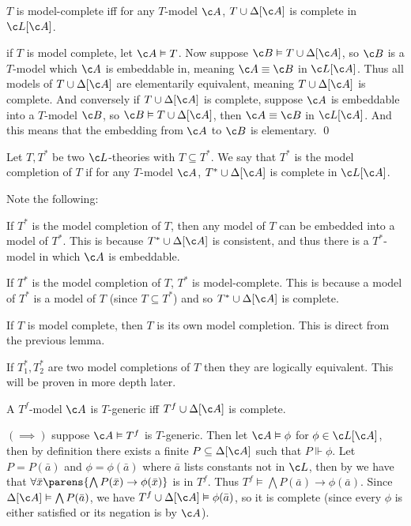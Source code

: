 \ethrm

\blemm

    $T$ is model-complete iff for any $T$-model $\c A$, $T\cup\Delta[\c A]$ is complete in $\c L[\c A]$.

\elemm

\Proof if $T$ is model complete, let $\c A\vDash T$.
Now suppose $\c B\vDash T\cup\Delta[\c A]$, so $\c B$ is a $T$-model which $\c A$ is embeddable in, meaning $\c A\equiv\c B$ in $\c L[\c A]$.
Thus all models of $T\cup\Delta[\c A]$ are elementarily equivalent, meaning $T\cup\Delta[\c A]$ is complete.
And conversely if $T\cup\Delta[\c A]$ is complete, suppose $\c A$ is embeddable into a $T$-model $\c B$, so $\c B\vDash T\cup\Delta[\c A]$, then $\c A\equiv\c B$ in $\c L[\c A]$.
And this means that the embedding from $\c A$ to $\c B$ is elementary.
\qed

\bdefn

    Let $T,T^*$ be two $\c L$-theories with $T\subseteq T^*$.
    We say that $T^*$ is the {\emphcolor model completion} of $T$ if for any $T$-model $\c A$, $T^*\cup\Delta[\c A]$ is complete in $\c L[\c A]$.

\edefn

Note the following:
\benum
    \item If $T^*$ is the model completion of $T$, then any model of $T$ can be embedded into a model of $T^*$.
    This is because $T^*\cup\Delta[\c A]$ is consistent, and thus there is a $T^*$-model in which $\c A$ is embeddable.
    \item If $T^*$ is the model completion of $T$, $T^*$ is model-complete.
    This is because a model of $T^*$ is a model of $T$ (since $T\subseteq T^*$) and so $T^*\cup\Delta[\c A]$ is complete.
    \item If $T$ is model complete, then $T$ is its own model completion.
    This is direct from the previous lemma.
    \item If $T_1^*,T_2^*$ are two model completions of $T$ then they are logically equivalent.
    This will be proven in more depth later.
\eenum

\bthrm[name=thrm5.2]

    A $T^f$-model $\c A$ is $T$-generic iff $T^f\cup\Delta[\c A]$ is complete.

\ethrm

\Proof $(\implies)$ suppose $\c A\vDash T^f$ is $T$-generic.
Then let $\c A\vDash\phi$ for $\phi\in\c L[\c A]$, then by definition there exists a finite $P\subseteq\Delta[\c A]$ such that $P\Vdash\phi$.
Let $P=P(\bar a)$ and $\phi=\phi(\bar a)$ where $\bar a$ lists constants not in $\c L$, then by  we have that $\forall\bar x\parens{\bigwedge P(\bar x)\to\phi(\bar x)}$ is
in $T^f$.
Thus $T^f\vDash\bigwedge P(\bar a)\to\phi(\bar a)$.
Since $\Delta[\c A]\vDash\bigwedge P(\bar a)$, we have $T^f\cup\Delta[\c A]\vDash\phi(\bar a)$, so it is complete (since every $\phi$ is either satisfied or its negation is by $\c A$).

